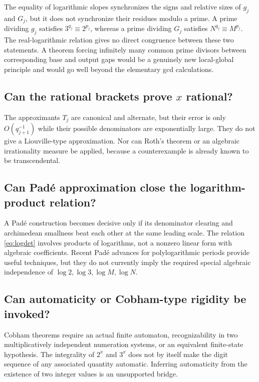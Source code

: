 \documentclass[11pt,oneside]{article}
\theoremstyle{definition}
\theoremstyle{remark}
\begin{document}
The equality of logarithmic slopes synchronizes the signs and relative sizes
of $g_j$ and $G_j$, but it does not synchronize their residues modulo a prime.
A prime dividing $g_j$ satisfies $3^{q_j}\equiv2^{p_j}$, whereas a prime
dividing $G_j$ satisfies $N^{q_j}\equiv M^{p_j}$.  The real-logarithmic
relation gives no direct congruence between these two statements.  A theorem
forcing infinitely many common prime divisors between corresponding base and
output gaps would be a genuinely new local-global principle and would go
well beyond the elementary gcd calculations.

\subsection{Can the rational brackets prove \texorpdfstring{$x$}{x} rational?}

The approximants $T_j$ are canonical and alternate, but their error is only
$O(q_{j+1}^{-1})$ while their possible denominators are exponentially large.
They do not give a Liouville-type approximation.  Nor can Roth's theorem or
an algebraic irrationality measure be applied, because a counterexample is
already known to be transcendental.

\subsection{Can Pad\'e approximation close the logarithm-product relation?}

A Pad\'e construction becomes decisive only if its denominator clearing and
archimedean smallness beat each other at the same leading scale.  The relation
\eqref{eq:logdet} involves products of logarithms, not a nonzero linear form
with algebraic coefficients.  Recent Pad\'e advances for polylogarithmic
periods provide useful techniques, but they do not currently imply the
required special algebraic independence of
$\log2,\log3,\log M,\log N$.

\subsection{Can automaticity or Cobham-type rigidity be invoked?}

Cobham theorems require an actual finite automaton, recognizability in two
multiplicatively independent numeration systems, or an equivalent finite-state
hypothesis.  The integrality of $2^x$ and $3^x$ does not by itself make the
digit sequence of any associated quantity automatic.  Inferring automaticity
from the existence of two integer values is an unsupported bridge.
\end{document}
